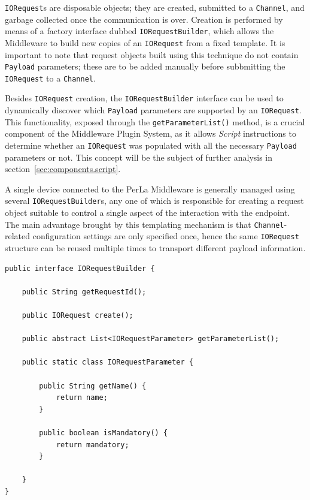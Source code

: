 \texttt{IORequest}s are disposable objects; they are created, submitted to a
\texttt{Channel}, and garbage collected once the communication is over.
Creation is performed by means of a factory interface dubbed
\texttt{IORequestBuilder}, which allows the Middleware to build new copies of
an \texttt{IORequest} from a fixed template. It is important to note that
request objects built using this technique do not contain \texttt{Payload}
parameters; these are to be added manually before subbmitting the
\texttt{IORequest} to a \texttt{Channel}.

Besides \texttt{IORequest} creation, the \texttt{IORequestBuilder} interface
can be used to dynamically discover which \texttt{Payload} parameters are
supported by an \texttt{IORequest}. This functionality, exposed through the
\texttt{getParameterList()} method, is a crucial component of the Middleware
Plugin System, as it allows \textit{Script} instructions to determine whether
an \texttt{IORequest} was populated with all the necessary \texttt{Payload}
parameters or not. This concept will be the subject of further analysis in
section~\ref{sec:components.script}.

A single device connected to the PerLa Middleware is generally managed using
several \texttt{IORequestBuilder}s, any one of which is responsible for
creating a request object suitable to control a single aspect of
the interaction with the endpoint. The main advantage brought by this
templating mechanism is that \texttt{Channel}-related configuration settings
are only specified once, hence the same \texttt{IORequest} structure can be
reused multiple times to transport different payload information.

\lstset{language=Java}
\begin{lstlisting}[float,floatplacement=!hbt,caption=The IORequestBuilder
interface,label={lst:iorequestbuilder}]
public interface IORequestBuilder {

	public String getRequestId();

	public IORequest create();

	public abstract List<IORequestParameter> getParameterList();

	public static class IORequestParameter {

		public String getName() {
			return name;
		}

		public boolean isMandatory() {
			return mandatory;
		}

	}
}
\end{lstlisting}

